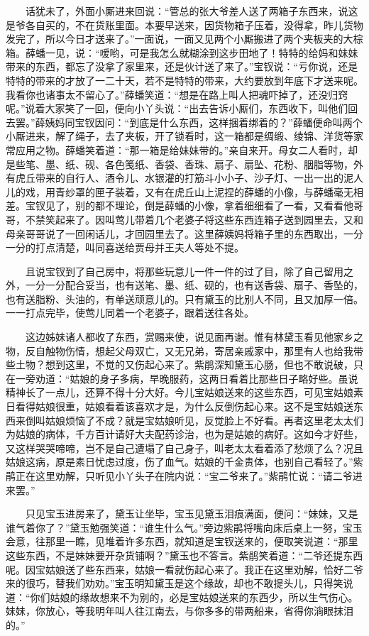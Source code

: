 　　话犹未了，外面小厮进来回说：“管总的张大爷差人送了两箱子东西来，说这是爷各自买的，不在货账里面。本要早送来，因货物箱子压着，没得拿，昨儿货物发完了，所以今日才送来了。”一面说，一面又见两个小厮搬进了两个夹板夹的大棕箱。薛蟠一见，说：“嗳哟，可是我怎么就糊涂到这步田地了！特特的给妈和妹妹带来的东西，都忘了没拿了家里来，还是伙计送了来了。”宝钗说：“亏你说，还是特特的带来的才放了一二十天，若不是特特的带来，大约要放到年底下才送来呢。我看你也诸事太不留心了。”薛蟠笑道：“想是在路上叫人把魂吓掉了，还没归窍呢。”说着大家笑了一回，便向小丫头说：“出去告诉小厮们，东西收下，叫他们回去罢。”薛姨妈同宝钗因问：“到底是什么东西，这样捆着绑着的？”薛蟠便命叫两个小厮进来，解了绳子，去了夹板，开了锁看时，这一箱都是绸缎、绫锦、洋货等家常应用之物。薛蟠笑着道：“那一箱是给妹妹带的。”亲自来开。母女二人看时，却是些笔、墨、纸、砚、各色笺纸、香袋、香珠、扇子、扇坠、花粉、胭脂等物，外有虎丘带来的自行人、酒令儿、水银灌的打筋斗小小子、沙子灯、一出一出的泥人儿的戏，用青纱罩的匣子装着，又有在虎丘山上泥捏的薛蟠的小像，与薛蟠毫无相差。宝钗见了，别的都不理论，倒是薛蟠的小像，拿着细细看了一看，又看看他哥哥，不禁笑起来了。因叫莺儿带着几个老婆子将这些东西连箱子送到园里去，又和母亲哥哥说了一回闲话儿，才回园里去了。这里薛姨妈将箱子里的东西取出，一分一分的打点清楚，叫同喜送给贾母并王夫人等处不提。

　　且说宝钗到了自己房中，将那些玩意儿一件一件的过了目，除了自己留用之外，一分一分配合妥当，也有送笔、墨、纸、砚的，也有送香袋、扇子、香坠的，也有送脂粉、头油的，有单送顽意儿的。只有黛玉的比别人不同，且又加厚一倍。一一打点完毕，使莺儿同着一个老婆子，跟着送往各处。

　　这边姊妹诸人都收了东西，赏赐来使，说见面再谢。惟有林黛玉看见他家乡之物，反自触物伤情，想起父母双亡，又无兄弟，寄居亲戚家中，那里有人也给我带些土物？想到这里，不觉的又伤起心来了。紫鹃深知黛玉心肠，但也不敢说破，只在一旁劝道：“姑娘的身子多病，早晚服药，这两日看着比那些日子略好些。虽说精神长了一点儿，还算不得十分大好。今儿宝姑娘送来的这些东西，可见宝姑娘素日看得姑娘很重，姑娘看着该喜欢才是，为什么反倒伤起心来。这不是宝姑娘送东西来倒叫姑娘烦恼了不成？就是宝姑娘听见，反觉脸上不好看。再者这里老太太们为姑娘的病体，千方百计请好大夫配药诊治，也为是姑娘的病好。这如今才好些，又这样哭哭啼啼，岂不是自己遭塌了自己身子，叫老太太看着添了愁烦了么？况且姑娘这病，原是素日忧虑过度，伤了血气。姑娘的千金贵体，也别自己看轻了。”紫鹃正在这里劝解，只听见小丫头子在院内说：“宝二爷来了。”紫鹃忙说：“请二爷进来罢。”

　　只见宝玉进房来了，黛玉让坐毕，宝玉见黛玉泪痕满面，便问：“妹妹，又是谁气着你了？”黛玉勉强笑道：“谁生什么气。”旁边紫鹃将嘴向床后桌上一努，宝玉会意，往那里一瞧，见堆着许多东西，就知道是宝钗送来的，便取笑说道：“那里这些东西，不是妹妹要开杂货铺啊？”黛玉也不答言。紫鹃笑着道：“二爷还提东西呢。因宝姑娘送了些东西来，姑娘一看就伤起心来了。我正在这里劝解，恰好二爷来的很巧，替我们劝劝。”宝玉明知黛玉是这个缘故，却也不敢提头儿，只得笑说道：“你们姑娘的缘故想来不为别的，必是宝姑娘送来的东西少，所以生气伤心。妹妹，你放心，等我明年叫人往江南去，与你多多的带两船来，省得你淌眼抹泪的。”

